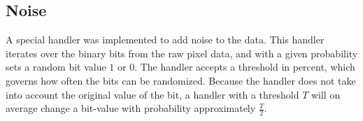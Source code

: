\subsection{Noise}
A special handler was implemented to add noise to the data. This handler iterates over the binary bits from the raw pixel data, and with a given probability sets a random bit value \(1\) or \(0\). The handler accepts a threshold in percent, which governs how often the bits can be randomized. Because the handler does not take into account the original value of the bit, a handler with a threshold \(T\) will on average change a bit-value with probability approximately \(\frac{T}{2}\).